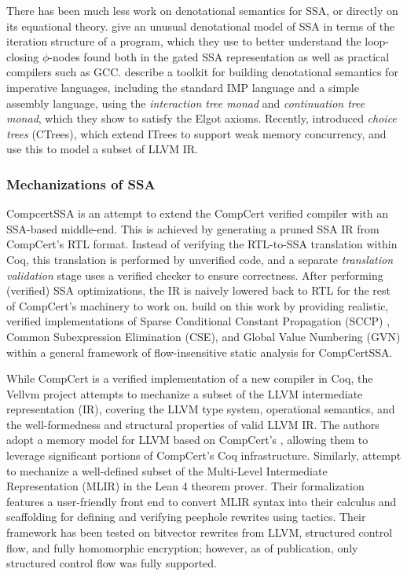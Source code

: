 \documentclass[acmsmall,screen,review]{acmart}
\begin{document}
There has been much less work on denotational semantics for SSA, or directly on its equational
theory. \citet{pop-ssa-inout-2009} give an unusual denotational model of SSA in terms of the
iteration structure of a program, which they use to better understand the loop-closing $\phi$-nodes
found both in the gated SSA representation as well as practical compilers such as GCC.
\citet{xia-20-itrees} describe a toolkit for building denotational semantics for imperative
languages, including the standard IMP language and a simple assembly language, using the
\emph{interaction tree monad} and \emph{continuation tree monad}, which they show to satisfy the
Elgot axioms. Recently, \citet{chappe-25-ctrees} introduced \emph{choice trees} (CTrees), which
extend ITrees to support weak memory concurrency, and use this to model a subset of LLVM IR.

\subsubsection{Mechanizations of SSA}

CompcertSSA \cite{compcert-ssa-12} is an attempt to extend the CompCert verified compiler
\cite{leroy-compcert-09} with an SSA-based middle-end. This is achieved by generating a pruned SSA
IR from CompCert's RTL format. Instead of verifying the RTL-to-SSA translation within Coq, this
translation is performed by unverified code, and a separate \emph{translation validation} stage uses
a verified checker to ensure correctness. After performing (verified) SSA optimizations, the IR is
naively lowered back to RTL for the rest of CompCert's machinery to work on. \citet{demange-ssa-15}
build on this work by providing realistic, verified implementations of Sparse Conditional Constant
Propagation (SCCP) \cite{wegman-sccp-91}, Common Subexpression Elimination (CSE), and Global Value
Numbering (GVN) \cite{rosen-gvn-1988} within a general framework of flow-insensitive static analysis
for CompCertSSA.

While CompCert is a verified implementation of a new compiler in Coq, the Vellvm project
\cite{vellvm-12} attempts to mechanize a subset of the LLVM intermediate representation (IR),
covering the LLVM type system, operational semantics, and the well-formedness and structural
properties of valid LLVM IR. The authors adopt a memory model for LLVM based on CompCert's
\cite{leroy-compcert-09}, allowing them to leverage significant portions of CompCert's Coq
infrastructure. Similarly, \citet{siddharth-24-peephole} attempt to mechanize a well-defined subset
of the Multi-Level Intermediate Representation (MLIR) in the Lean 4 theorem prover. Their
formalization features a user-friendly front end to convert MLIR syntax into their calculus and
scaffolding for defining and verifying peephole rewrites using tactics. Their framework has been
tested on bitvector rewrites from LLVM, structured control flow, and fully homomorphic encryption;
however, as of publication, only structured control flow was fully supported.
\end{document}
